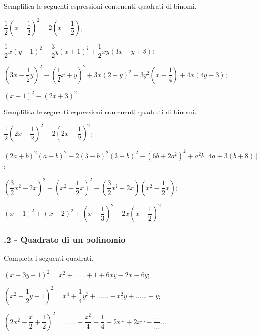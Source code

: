 \begin{esercizio}[\Ast]
 \label{ese:11.9}
Semplifica le seguenti espressioni contenenti quadrati di binomi.

\begin{enumeratea}
 \item $\dfrac{1}{2}\left(x-\dfrac{1}{2}\right)^{2}-2\left(x-\dfrac{1}{2}\right)$;
 \item $\dfrac{1}{2}x(y-1)^{2}-\dfrac{3}{2}y(x+1)^{2}+\dfrac{1}{2}{xy}(3x-y+8)$;
 \item $\left(3x-\dfrac{1}{2}y\right)^{2}-\left(\dfrac{1}{2}x+y\right)^{2}+3x(2-y)^{2}-3y^{2}\left(x-\dfrac{1}{4}\right)+4x(4y-3)$;
 \item $\left(x-1\right)^{2}-\left(2x+3\right)^{2}$.
\end{enumeratea}
\end{esercizio}

\begin{esercizio}[\Ast]
 \label{ese:11.10}
Semplifica le seguenti espressioni contenenti quadrati di binomi.

\begin{enumeratea}
 \item $\dfrac{1}{2}\left(2x+\dfrac{1}{2}\right)^{2}-2\left(2x-\dfrac{1}{2}\right)^{2}$;
 \item $(2a+b)^{2}(a-b)^{2}-2(3-b)^{2}(3+b)^{2}-(6b+2a^{2})^{2}+a^{2}b[4a+3(b+8)]$;
 \item $\left(\dfrac{3}{2}x^{2}-2x\right)^{2}+\left(x^{2}-\dfrac{1}{2}x\right)^{2}-\left(\dfrac{3}{2}x^{2}-2x\right)\left(x^{2}-\dfrac{1}{2}x\right)$;
 \item $(x+1)^{2}+(x-2)^{2}+\left(x-\dfrac{1}{3}\right)^{2}-2x\left(x-\dfrac{1}{2}\right)^{2}$.
\end{enumeratea}
\end{esercizio}

\subsubsection*{\thechapter.2 - Quadrato di un polinomio}

\begin{esercizio}
 \label{ese:11.11}
Completa i seguenti quadrati.

\begin{enumeratea}
\spazielenx
\item $\left(x+3y-1\right)^{2}=x^{2}+\ldots \ldots +1+6xy-2x-6y$;
\item $\left(x^{2}-\dfrac{1}{2}y+1\right)^{2}=x^{4}+\dfrac{1}{4}y^{2}+\ldots\ldots -x^{2}y+\ldots\ldots -y$;
\item $\left(2x^{2}-\dfrac{x}{2}+\dfrac{1}{2}\right)^{2}=\ldots\ldots +\dfrac{x^{2}}{4}%
+\dfrac{1}{4}-2x^{\ldots }+2x^{\ldots}-\dfrac{\ldots}{\ldots}\ldots $
\end{enumeratea}
\end{esercizio}

